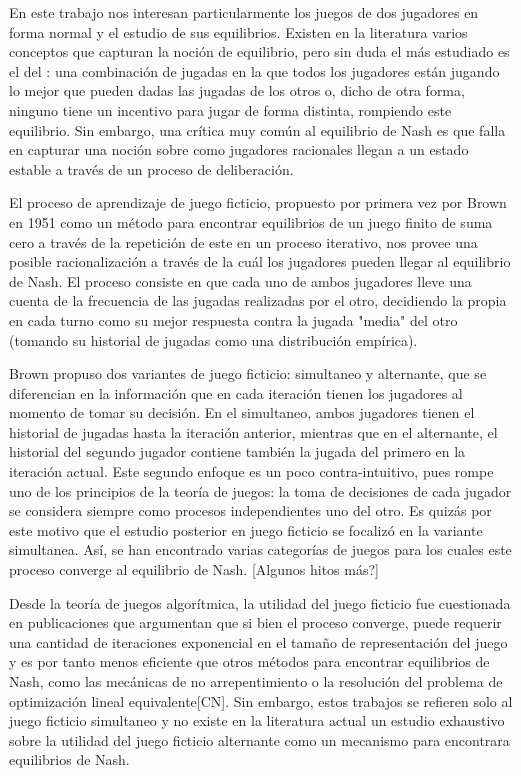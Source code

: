 En este trabajo nos interesan particularmente los juegos de dos jugadores en forma normal y el estudio de sus equilibrios. Existen en la literatura varios conceptos que capturan la noción de equilibrio, pero sin duda el más estudiado es el del : una combinación de jugadas en la que todos los jugadores están jugando lo mejor que pueden dadas las jugadas de los otros o, dicho de otra forma, ninguno tiene un incentivo para jugar de forma distinta, rompiendo este equilibrio. Sin embargo, una crítica muy común al equilibrio de Nash es que falla en capturar una noción sobre como jugadores racionales llegan a un estado estable a través de un proceso de deliberación.

El proceso de aprendizaje de juego ficticio, propuesto por primera vez por Brown en 1951 \cite{brown:1951} como un método para encontrar equilibrios de un juego finito de suma cero \cite{libro:rubinstein} a través de la repetición de este en un proceso iterativo, nos provee una posible racionalización a través de la cuál los jugadores pueden llegar al equilibrio de Nash. El proceso consiste en que cada uno de ambos jugadores lleve una cuenta de la frecuencia de las jugadas realizadas por el otro, decidiendo la propia en cada turno como su mejor respuesta contra la jugada "media" del otro (tomando su historial de jugadas como una distribución empírica). 

Brown propuso dos variantes de juego ficticio: simultaneo y alternante, que se diferencian en la información que en cada iteración tienen los jugadores al momento de tomar su decisión. En el simultaneo, ambos jugadores tienen el historial de jugadas hasta la iteración anterior, mientras que en el alternante, el historial del segundo jugador contiene también la jugada del primero en la iteración actual. Este segundo enfoque es un poco contra-intuitivo, pues rompe uno de los principios de la teoría de juegos: la toma de decisiones de cada jugador se considera siempre como procesos independientes uno del otro. Es quizás por este motivo que el estudio posterior en juego ficticio se focalizó en la variante simultanea. Así, se han encontrado varias categorías de juegos para los cuales este proceso converge al equilibrio de Nash. [Algunos hitos más?]

Desde la teoría de juegos algorítmica, la utilidad del juego ficticio fue cuestionada en publicaciones que argumentan que si bien el proceso converge, puede requerir una cantidad de iteraciones exponencial en el tamaño de representación del juego y es por tanto menos eficiente que otros métodos para encontrar equilibrios de Nash, como las mecánicas de no arrepentimiento o la resolución del problema de optimización lineal equivalente[CN]. Sin embargo, estos trabajos se refieren solo al juego ficticio simultaneo y no existe en la literatura actual un estudio exhaustivo sobre la utilidad del juego ficticio alternante como un mecanismo para encontrara equilibrios de Nash.

